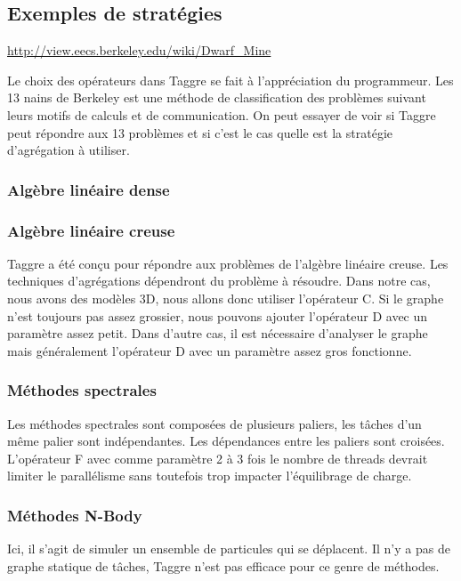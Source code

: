 \subsection{Exemples de stratégies}
\url{http://view.eecs.berkeley.edu/wiki/Dwarf_Mine}

Le choix des opérateurs dans Taggre se fait à l'appréciation du programmeur.
%
Les 13 nains de Berkeley est une méthode de classification des problèmes suivant leurs motifs de calculs et de communication.
%
On peut essayer de voir si Taggre peut répondre aux 13 problèmes et si c'est le cas quelle est la stratégie d'agrégation à utiliser.

\subsubsection{Algèbre linéaire dense}


\subsubsection{Algèbre linéaire creuse}
Taggre a été conçu pour répondre aux problèmes de l'algèbre linéaire creuse.
%
Les techniques d'agrégations dépendront du problème à résoudre.
%
Dans notre cas, nous avons des modèles 3D, nous allons donc utiliser l'opérateur C.
%
Si le graphe n'est toujours pas assez grossier, nous pouvons ajouter l'opérateur D avec un paramètre assez petit.
%
Dans d'autre cas, il est nécessaire d'analyser le graphe mais généralement l'opérateur D avec un paramètre assez gros fonctionne.



\subsubsection{Méthodes spectrales}
Les méthodes spectrales sont composées de plusieurs paliers, les tâches d'un même palier sont indépendantes.
%
Les dépendances entre les paliers sont croisées.
%
L'opérateur F avec comme paramètre 2 à 3 fois le nombre de threads devrait limiter le parallélisme sans toutefois trop impacter l'équilibrage de charge.



\subsubsection{Méthodes N-Body}
Ici, il s'agit de simuler un ensemble de particules qui se déplacent.
%
Il n'y a pas de graphe statique de tâches, Taggre n'est pas efficace pour ce genre de méthodes.



